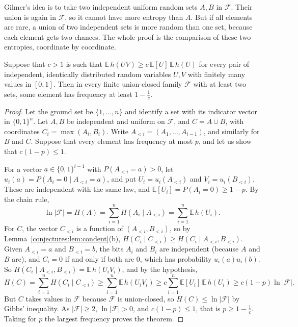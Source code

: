 Gilmer's idea is to take two independent uniform random sets $A,B$ in $\mathcal F$. Their union is again in $\mathcal F$, so it cannot have more entropy
than $A$. But if all elements are rare, a union of two independent sets is more random than one set, because each element gets two chances. The whole
proof is the comparison of these two entropies, coordinate by coordinate.

\begin{theorem}\label{conjectures:thm:gilmer}
Suppose that $c>1$ is such that $\mathbb E\,h(UV)\ge c\,\mathbb E[U]\,\mathbb E\,h(U)$ for every pair of independent, identically distributed random
variables $U,V$ with finitely many values in $[0,1]$. Then in every finite union-closed family $\mathcal F$ with at least two sets, some element has
frequency at least $1-\frac1c$.
\end{theorem}
\begin{proof}
Let the ground set be $\{1,\dots,n\}$ and identify a set with its indicator vector in $\{0,1\}^n$. Let $A,B$ be independent and uniform on $\mathcal F$,
and $C=A\cup B$, with coordinates $C_i=\max(A_i,B_i)$. Write $A_{<i}=(A_1,\dots,A_{i-1})$, and similarly for $B$ and $C$. Suppose that every element has
frequency at most $p$, and let us show that $c(1-p)\le1$.

For a vector $a\in\{0,1\}^{i-1}$ with $P(A_{<i}=a)>0$, let $u_i(a)=P(A_i=0\mid A_{<i}=a)$, and put $U_i=u_i(A_{<i})$ and $V_i=u_i(B_{<i})$. These are
independent with the same law, and $\mathbb E[U_i]=P(A_i=0)\ge1-p$. By the chain rule,
\[
\ln|\mathcal F|=H(A)=\sum_{i=1}^nH(A_i\mid A_{<i})=\sum_{i=1}^n\mathbb E\,h(U_i).
\]
For $C$, the vector $C_{<i}$ is a function of $(A_{<i},B_{<i})$, so by Lemma~\ref{conjectures:lem:condent}(b),
$H(C_i\mid C_{<i})\ge H(C_i\mid A_{<i},B_{<i})$. Given $A_{<i}=a$ and $B_{<i}=b$, the bits $A_i$ and $B_i$ are independent (because $A$ and $B$ are), and
$C_i=0$ if and only if both are $0$, which has probability $u_i(a)u_i(b)$. So $H(C_i\mid A_{<i},B_{<i})=\mathbb E\,h(U_iV_i)$, and by the hypothesis,
\[
H(C)=\sum_{i=1}^nH(C_i\mid C_{<i})\ge\sum_{i=1}^n\mathbb E\,h(U_iV_i)\ge c\sum_{i=1}^n\mathbb E[U_i]\,\mathbb E\,h(U_i)\ge c(1-p)\ln|\mathcal F|.
\]
But $C$ takes values in $\mathcal F$ because $\mathcal F$ is union-closed, so $H(C)\le\ln|\mathcal F|$ by Gibbs' inequality. As $|\mathcal F|\ge2$,
$\ln|\mathcal F|>0$, and $c(1-p)\le1$, that is $p\ge1-\frac1c$. Taking for $p$ the largest frequency proves the theorem.
\end{proof}

